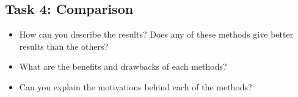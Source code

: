 \documentclass[paper=a4, fontsize=11pt]{scrartcl} %
\numberwithin{equation}{section} %
\numberwithin{figure}{section} %
\numberwithin{table}{section} %
\begin{document}

\subsection{Task 4: Comparison}

\begin{itemize}
	\item How can you describe the results? Does any of these methods give better results than the others? 
	\item What are the benefits and drawbacks of each methods?
	\item Can you explain the motivations behind each of the methods? 
\end{itemize}



 

\end{document}
